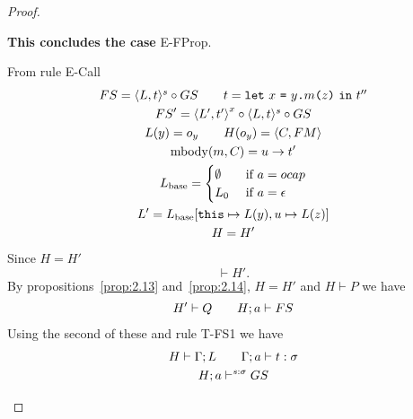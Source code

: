 \begin{proof}
\begin{description}
\begin{description}
\begin{description}
              {\bf This concludes the case} {\sc E-FProp}.
          \end{description}

        \item[Case {\sc E-Call}:] From rule {\sc E-Call}
          \begin{equation} \label{eq:ecall1}
            \begin{gathered}
              FS = \mbox{$\langle L, t \rangle^s$} \circ GS \quad\quad t = \mbox{\texttt{let}~$x$~\texttt{=}~$\mbox{$y$\texttt{.}$m$\texttt{(}$z$\texttt{)}}$~\texttt{in}~$t''$}\\
              FS' = \mbox{$\langle L', t' \rangle$}^x \circ \mbox{$\langle L, t \rangle^s$} \circ GS \\
              L(y) = o_y \quad\quad H(o_y) = \mbox{$\langle C, FM \rangle$} \\
              \mbox{$\mathrm{mbody}$}(m, C) = u \to t' \\
              L_{\text{base}} =
              \begin{cases}
                \emptyset & \text{ if } a = \mbox{$ocap$} \\
                L_0       & \text{ if } a = \mbox{$\epsilon$}
              \end{cases} \\
              L' = L_{\text{base}}[\mbox{\texttt{this}} \mapsto L(y), u \mapsto L(z)] \\
              H = H'
            \end{gathered}
          \end{equation}
          Since $H = H'$ 
          \begin{equation*}
            \vdash H'.
          \end{equation*}
          By propositions~\ref{prop:2.13} and~\ref{prop:2.14}, $H = H'$ and
          $H \vdash P$ we have
          \begin{equation}
            \begin{gathered}
              H' \vdash Q \quad\quad H;a \vdash FS
            \end{gathered}
          \end{equation}
          Using the second of these and rule {\sc T-FS1} we have
          \begin{equation} \label{eq:ecall-hp0}
            \begin{gathered}
              H \vdash \Gamma; L \andalso \TypeRel{\Gamma}{a}{t}{\sigma} \\
              H; a \vdash^{s:\sigma} GS
            \end{gathered}

\end{equation}
\end{description}
\end{description}
\end{proof}

